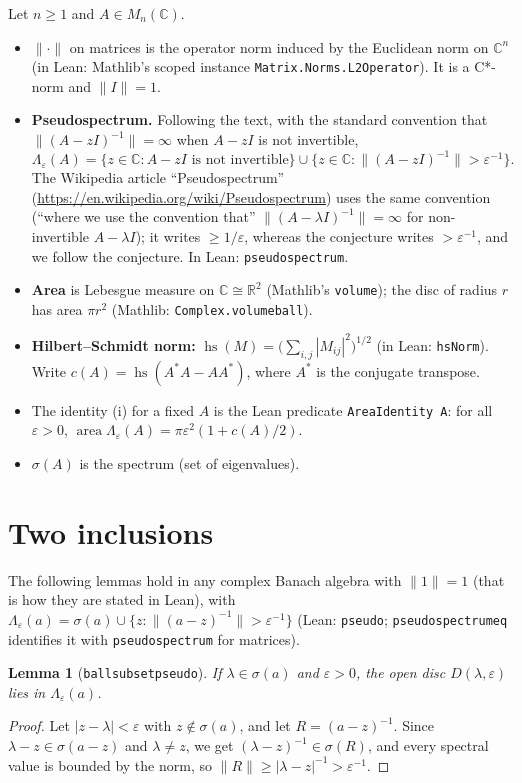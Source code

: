 \documentclass[11pt]{article}
\newtheorem{lemma}[theorem]{Lemma}
\theoremstyle{definition}
\theoremstyle{remark}
\renewcommand{\_}{\oldus\allowbreak}
\newcommand{\C}{\mathbb{C}}
\newcommand{\area}{\operatorname{area}}
\newcommand{\hs}{\operatorname{hs}}
\begin{document}
Let $n\ge1$ and $A\in M_n(\C)$.
\begin{itemize}
  \item $\|\cdot\|$ on matrices is the operator norm induced by the Euclidean norm on $\C^n$ (in Lean:
        Mathlib's scoped instance \texttt{Matrix.Norms.L2Operator}). It is a C*-norm and $\|I\|=1$.
  \item \textbf{Pseudospectrum.} Following the text, with the standard convention that
        $\|(A-zI)^{-1}\| = \infty$ when $A-zI$ is not invertible,
        \[ \Lambda_\varepsilon(A) = \{ z\in\C : A-zI \text{ is not invertible} \} \cup
           \{ z\in\C : \|(A-zI)^{-1}\| > \varepsilon^{-1} \}. \]
        The Wikipedia article ``Pseudospectrum'' (\url{https://en.wikipedia.org/wiki/Pseudospectrum}) uses the
        same convention (``where we use the convention that'' $\|(A-\lambda I)^{-1}\|=\infty$ for non-invertible
        $A-\lambda I$); it writes $\ge 1/\varepsilon$, whereas the conjecture writes $>\varepsilon^{-1}$, and we
        follow the conjecture. In Lean: \texttt{pseudospectrum}.
  \item \textbf{Area} is Lebesgue measure on $\C\cong\mathbb{R}^2$ (Mathlib's \texttt{volume}); the disc of
        radius $r$ has area $\pi r^2$ (Mathlib: \texttt{Complex.volume\_ball}).
  \item \textbf{Hilbert--Schmidt norm:} $\hs(M) = \big(\sum_{i,j}|M_{ij}|^2\big)^{1/2}$ (in Lean:
        \texttt{hsNorm}). Write $c(A) = \hs(A^*A - AA^*)$, where $A^*$ is the conjugate transpose.
  \item The identity (i) for a fixed $A$ is the Lean predicate \texttt{AreaIdentity A}:
        for all $\varepsilon>0$, $\area\Lambda_\varepsilon(A) = \pi\varepsilon^2(1+c(A)/2)$.
  \item $\sigma(A)$ is the spectrum (set of eigenvalues).
\end{itemize}

\section{Two inclusions}

The following lemmas hold in any complex Banach algebra with $\|1\|=1$ (that is how they are stated in Lean),
with $\Lambda_\varepsilon(a) = \sigma(a)\cup\{z : \|(a-z)^{-1}\|>\varepsilon^{-1}\}$ (Lean: \texttt{pseudo};
\texttt{pseudospectrum\_eq} identifies it with \texttt{pseudospectrum} for matrices).

\begin{lemma}[\texttt{ball\_subset\_pseudo}]\label{lem:in}
If $\lambda\in\sigma(a)$ and $\varepsilon>0$, the open disc $D(\lambda,\varepsilon)$ lies in
$\Lambda_\varepsilon(a)$.
\end{lemma}
\begin{proof}
Let $|z-\lambda|<\varepsilon$ with $z\notin\sigma(a)$, and let $R=(a-z)^{-1}$. Since
$\lambda - z\in\sigma(a-z)$ and $\lambda\ne z$, we get $(\lambda-z)^{-1}\in\sigma(R)$, and every spectral value is
bounded by the norm, so $\|R\| \ge |\lambda-z|^{-1} > \varepsilon^{-1}$.
\end{proof}
\end{document}
